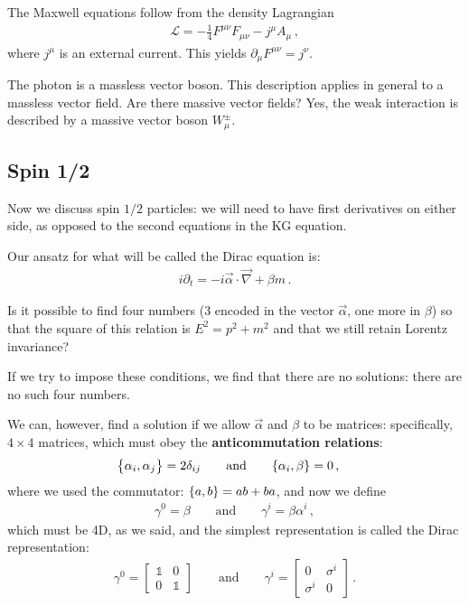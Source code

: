 \documentclass[main.tex]{subfiles}
\begin{document}
The Maxwell equations follow from the density Lagrangian 
%
\begin{align}
\mathscr{L} = - \frac{1}{4} F^{\mu \nu } F_{\mu \nu } - j^{\mu } A_{\mu }
\,,
\end{align}
%
where \(j^{\mu }\) is an external current. This yields \(\partial_{\mu } F^{\mu \nu } = j^{\nu }\). 

The photon is a massless vector boson. This description applies in general to a massless vector field. 
Are there massive vector fields?
Yes, the weak interaction is described by a massive vector boson \(W^{\pm}_{\mu }\).

\subsection{Spin 1/2}

Now we discuss spin \(1/2\) particles: we will need to have first derivatives on either side, as opposed to the second equations in the KG equation.

Our ansatz for what will be called the Dirac equation is: 
%
\begin{align}
i \partial_{t} = - i \vec{\alpha} \cdot \vec{\nabla} + \beta m
\,.
\end{align}

Is it possible to find four numbers (3 encoded in the vector \(\vec{\alpha} \), one more in \(\beta \)) so that the square of this relation is \(E^2 = p^2+m^2\) and that we still retain Lorentz invariance? 

If we try to impose these conditions, we find that there are no solutions: there are no such four numbers. 

We can, however, find a solution if we allow \(\vec{\alpha}\) and \(\beta \) to be matrices: specifically, \(4 \times 4 \) matrices, which must obey the \textbf{anticommutation relations}: 
%
\begin{align}
\qty{\alpha_{i}, \alpha_{j}} &= 2\delta_{ij} 
\qquad \text{and} \qquad
\qty{\alpha_{i}, \beta } = 0
\,,
\end{align}
%
where we used the commutator: \(\qty{a, b} = ab + ba\),
and now we define 
%
\begin{align}
\gamma^{0} = \beta 
\qquad \text{and} \qquad
\gamma^{i} = \beta \alpha^{i}
\,,
\end{align}
%
which must be 4D, as we said, and the simplest representation is called the Dirac representation:
%
\begin{subequations}
\begin{align}
\gamma^{0} = \left[\begin{array}{cc}
\mathbb{1} & 0 \\ 
0 & \mathbb{1}
\end{array}\right] 
\qquad \text{and} \qquad
\gamma^{i} = \left[\begin{array}{cc}
0 & \sigma^{i}   \\ 
\sigma^{i} & 0
\end{array}\right]
\,.
\end{align}
\end{subequations}
\end{document}
